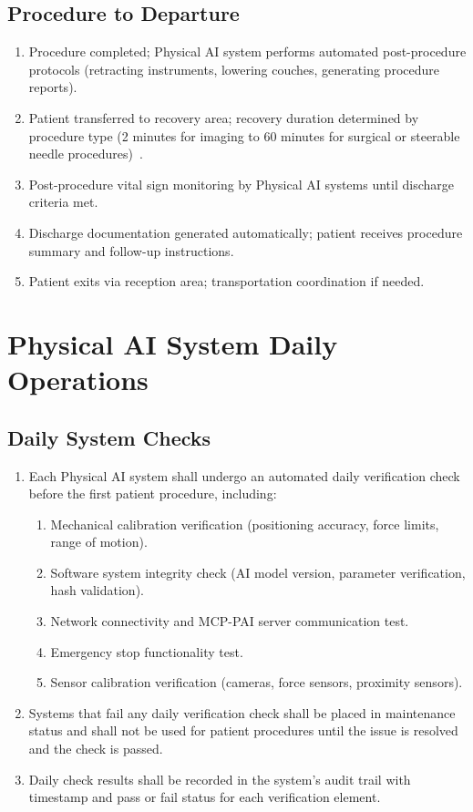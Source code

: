\subsection{Procedure to Departure}

\begin{enumerate}[label=(\alph*)]
\item Procedure completed; Physical AI system performs automated post-procedure
  protocols (retracting instruments, lowering couches, generating procedure
  reports).
\item Patient transferred to recovery area; recovery duration determined by
  procedure type (2 minutes for imaging to 60 minutes for surgical or
  steerable needle procedures)~\cite{patientinstructions2026}.
\item Post-procedure vital sign monitoring by Physical AI systems until
  discharge criteria met.
\item Discharge documentation generated automatically; patient receives
  procedure summary and follow-up instructions.
\item Patient exits via reception area; transportation coordination if needed.
\end{enumerate}

\section{Physical AI System Daily Operations}

\subsection{Daily System Checks}

\begin{enumerate}[label=(\alph*)]
\item Each Physical AI system shall undergo an automated daily verification
  check before the first patient procedure, including:
  \begin{enumerate}[label=(\arabic*)]
  \item Mechanical calibration verification (positioning accuracy, force
    limits, range of motion).
  \item Software system integrity check (AI model version, parameter
    verification, hash validation).
  \item Network connectivity and MCP-PAI server communication test.
  \item Emergency stop functionality test.
  \item Sensor calibration verification (cameras, force sensors, proximity
    sensors).
  \end{enumerate}

\item Systems that fail any daily verification check shall be placed in
  maintenance status and shall not be used for patient procedures until
  the issue is resolved and the check is passed.

\item Daily check results shall be recorded in the system's audit trail with
  timestamp and pass or fail status for each verification element.
\end{enumerate}

